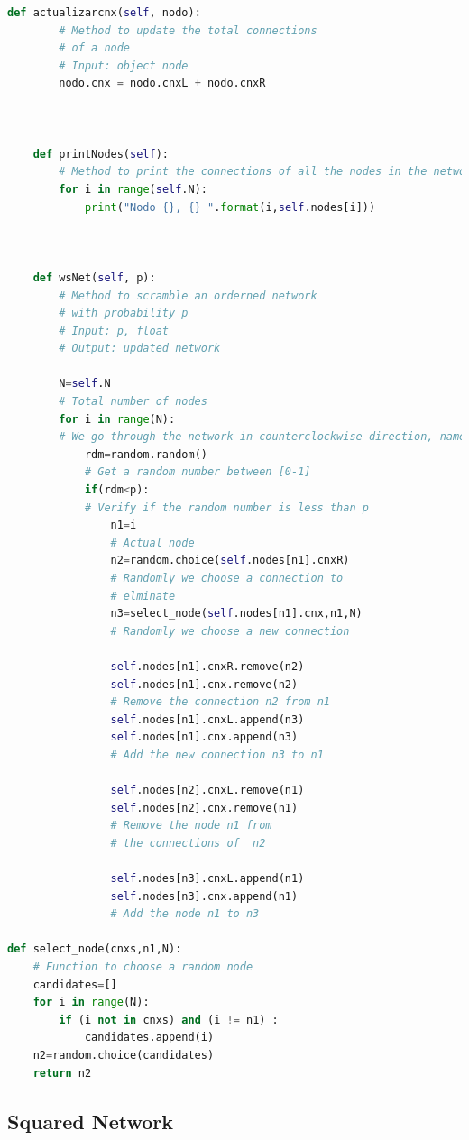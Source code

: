 \documentclass{article}
\begin{document}
\begin{lstlisting}[language=Python, caption= Small World Network Class]
    def actualizarcnx(self, nodo):
        # Method to update the total connections 
        # of a node
        # Input: object node
        nodo.cnx = nodo.cnxL + nodo.cnxR
        
        

    def printNodes(self):
        # Method to print the connections of all the nodes in the network
        for i in range(self.N):
            print("Nodo {}, {} ".format(i,self.nodes[i]))



    def wsNet(self, p):
        # Method to scramble an orderned network
        # with probability p
        # Input: p, float 
        # Output: updated network
        
        N=self.N
        # Total number of nodes
        for i in range(N):
        # We go through the network in counterclockwise direction, namely the from 0 to N. We assume that we had a circular network representation.
            rdm=random.random()
            # Get a random number between [0-1]
            if(rdm<p):
            # Verify if the random number is less than p
                n1=i 
                # Actual node
                n2=random.choice(self.nodes[n1].cnxR) 
                # Randomly we choose a connection to 
                # elminate
                n3=select_node(self.nodes[n1].cnx,n1,N) 
                # Randomly we choose a new connection

                self.nodes[n1].cnxR.remove(n2)
                self.nodes[n1].cnx.remove(n2)
                # Remove the connection n2 from n1
                self.nodes[n1].cnxL.append(n3)
                self.nodes[n1].cnx.append(n3)
                # Add the new connection n3 to n1
            
                self.nodes[n2].cnxL.remove(n1)
                self.nodes[n2].cnx.remove(n1)
                # Remove the node n1 from 
                # the connections of  n2
                
                self.nodes[n3].cnxL.append(n1)
                self.nodes[n3].cnx.append(n1)
                # Add the node n1 to n3

def select_node(cnxs,n1,N):
    # Function to choose a random node
    candidates=[]    
    for i in range(N):
        if (i not in cnxs) and (i != n1) :
            candidates.append(i)
    n2=random.choice(candidates)
    return n2
\end{lstlisting}

\subsection{Squared Network}
\end{document}
